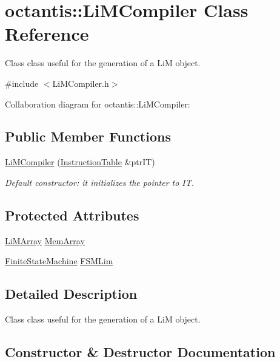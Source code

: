 \hypertarget{classoctantis_1_1LiMCompiler}{}\section{octantis\+:\+:Li\+M\+Compiler Class Reference}
\label{classoctantis_1_1LiMCompiler}


Class class useful for the generation of a LiM object.  




{\ttfamily \#include $<$Li\+M\+Compiler.\+h$>$}



Collaboration diagram for octantis\+:\+:Li\+M\+Compiler\+:
\subsection*{Public Member Functions}
\begin{DoxyCompactItemize}
\item 
\hyperlink{classoctantis_1_1LiMCompiler_a5bd2a38da7d74bfd9f990a50dc86d2e6}{Li\+M\+Compiler} (\hyperlink{classoctantis_1_1InstructionTable}{Instruction\+Table} \&ptr\+IT)
\begin{DoxyCompactList}\small\item\em Default constructor\+: it initializes the pointer to IT. \end{DoxyCompactList}\end{DoxyCompactItemize}
\subsection*{Protected Attributes}
\begin{DoxyCompactItemize}
\item 
\hyperlink{classoctantis_1_1LiMArray}{Li\+M\+Array} \hyperlink{classoctantis_1_1LiMCompiler_a11525f37ba87ad8a807407ce4b289c0d}{Mem\+Array}
\item 
\hyperlink{classoctantis_1_1FiniteStateMachine}{Finite\+State\+Machine} \hyperlink{classoctantis_1_1LiMCompiler_af1779840f74fcbf74bdd7973082ed64d}{F\+S\+M\+Lim}
\end{DoxyCompactItemize}


\subsection{Detailed Description}
Class class useful for the generation of a LiM object. 

\subsection{Constructor \& Destructor Documentation}
\mbox{\label{classoctantis_1_1LiMCompiler_a5bd2a38da7d74bfd9f990a50dc86d2e6}} 
